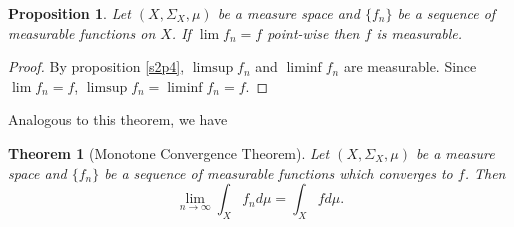 \documentclass{article}
\theoremstyle{plain}
\newtheorem{thm}{Theorem}
\numberwithin{thm}{section}
\theoremstyle{plain}
\newtheorem{prop}{Proposition}
\numberwithin{prop}{section}
\theoremstyle{definition}
\numberwithin{defn}{section}
\theoremstyle{remark}
\theoremstyle{plain}
\numberwithin{cor}{section}
\numberwithin{equation}{section}
\begin{document}
\begin{prop}\label{c4p1}
Let $(X, \Sigma_X, \mu)$ be a measure space and $\{f_n\}$ be a sequence of
measurable functions on $X$. If $\lim f_n = f$ point-wise then $f$ is
measurable.
\end{prop}
\begin{proof}
By proposition \ref{s2p4}, $\limsup f_n$ and $\liminf f_n$ are measurable.
Since $\lim f_n = f$, $\limsup f_n = \liminf f_n = f$.
\end{proof}

Analogous to this theorem, we have
\begin{thm}[Monotone Convergence Theorem]\label{s4t2}Let $(X, \Sigma_X, \mu)$ be a 
measure space and $\{f_n\}$ be a sequence of measurable functions which 
converges to $f$. Then 
\[
\lim_{n\rightarrow\infty}\int_X f_n d\mu = \int_X fd\mu.
\]
\end{thm}
\end{document}
